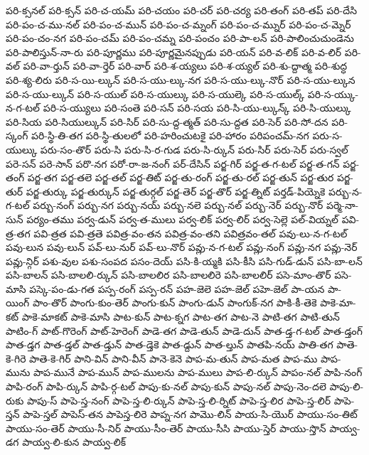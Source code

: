 {పరి-క్సనల్
పరి-క్సన్
పరి-చ-యమ్
పరి-చయం
పరి-చర్
పరి-చర్య
పరి-తంగ్
పరి-తప్
పరి-దేసి
పరి-పం-చ-ము-నల్
పరి-పం-చ-మున్
పరి-పం-చ-మ్నంగ్
పరి-పం-చ-మ్నుర్
పరి-పం-చ-మ్నెర్
పరి-పం-చం-నగ
పరి-పం-చమ్
పరి-పం-చమ్న
పరి-పంచం
పరి-పా-లన్
పరి-పాలించుచుండెను
పరి-పాలిస్తున్-నా-రు
పరి-పూర్ణము
పరి-పూర్ణమైనప్పుడు
పరి-యన్
పరి-వ-లిక్
పరి-వ-లిర్
పరి-వల్
పరి-వా-ర్తున్
పరి-వా-ర్తెర్
పరి-వార్
పరి-శ-య్యలు
పరి-శ-య్యల్
పరి-శు-ద్దాత్మ
పరి-శుద్ధ
పరి-శ్య-లిరు
పరి-స-యి-ల్కున్
పరి-స-యు-ల్కు-నగ
పరి-స-యు-ల్కు-నొర్
పరి-స-యు-ల్కున
పరి-స-యు-ల్కున్
పరి-స-యుల్
పరి-స-యుల్కు
పరి-స-యుల్కె
పరి-స-యుల్క్
పరి-స-య్కు-న-గ-టల్
పరి-స-య్యులు
పరి-సంతె
పరి-సన్
పరి-సయ
పరి-సి-యు-ల్కున్క్
పరి-సి-యుల్కు
పరి-సియ
పరి-సియుల్కున్
పరి-సిర్
పరి-సు-ద్ద-త్మత్
పరి-సు-ద్దత
పరి-సెర్
పరి-సో-దన
పరి-స్కంగ్
పరి-స్థి-తి-తగ
పరి-స్థి-తులలో
పరి-హరించుటకై
పరి-హారం
పరిపంచమ్-నగ
పరు-స-యుల్కు
పరు-సం-తొర్
పరు-సి
పరు-సి-ర-గుడ
పరు-సి-ర్కున్
పరు-సిర్
పరు-సెర్
పరు-స్వల్
పరె-సన్
పరె-సాన్
పరొ-నగ
పరో-రా-జ-నంగ్
పర్-దేసిన్
పర్జ-గిర్
పర్జ-త-గ-టల్
పర్జ-త-గన్
పర్జ-తంగ్
పర్జ-తగ
పర్జ-తలె
పర్జ-తల్
పర్జ-తిట్
పర్జ-తు-రంగ్
పర్జ-తు-రల్
పర్జ-తున్
పర్జ-తుర
పర్జ-తుర్
పర్జ-తుర్కు
పర్జ-తుర్కున్
పర్జ-తుర్గల్
పర్జ-తెర్
పర్జ-తొర్
పర్జ-త్నిట్
పర్తడ్-పియ్నెకె
పర్బు-న-గ-టల్
పర్బు-నంగ్
పర్బు-నగ
పర్బు-నయ్
పర్బు-నలె
పర్బు-నల్
పర్బు-నెర్
పర్బు-నొర్
పర్మె-నా-సున్
పర్యం-తము
పర్వ-డున్
పర్వ-త-ములు
పర్వ-లిక్
పర్వ-లిర్
పర్వ-సెల్లె
పల్-వియ్నల్
పవి-త్ర-తగ
పవి-త్రత
పవి-త్రతె
పవిత్ర-వం-తన
పవిత్ర-వం-తని
పవిత్రవం-తల్
పవు-లు-న-గ-టల్
పవు-లున
పవు-లున్
పవ్-లు-నుర్
పవ్-లు-నొర్
పవ్లు-న-గ-టల్
పవ్లు-నంగ్
పవ్లు-నగ
పవ్లు-నెర్
పవ్లు-న్గిర్
పశు-వుల
పశు-సంపద
పసం-దెయ్
పసి-కి-య్మకి
పసి-కీసి
పసి-గుడ్-డున్
పసి-బా-లన్
పసి-బాలన్
పసి-బాలలి-ర్కున్
పసి-బాలలిర
పసి-బాలలిరె
పసి-బాలలిర్
పసె-మాం-తొర్
పసె-మాసి
పస్కె-పం-డు-గత
పస్ప-రంగ్
పస్ప-రన్
పహ-జెలె
పహ-జెల్
పహె-జెల్
పా-యన
పా-యింగ్
పాం-తొర్
పాంగు-కుం-తెర్
పాంగు-కున్
పాంగు-డున్
పాంగుక్-నగ
పాకి-కీ-తెకె
పాకె-మా-కట్
పాకె-మాకట్
పాకె-మాసి
పాట-కున్
పాట-క్నగ
పాట-తగ
పాట-నె
పాటి-తగ
పాటి-తున్
పాటిం-గ్
పాట్-గొరెంగ్
పాట్-హెరెంగ్
పాడె-తగ
పాడె-తున్
పాడె-దున్
పాత-డ్త-గ-టల్
పాత-డ్తంగ్
పాత-డ్తగ
పాత-డ్తల్
పాత-డ్తున్
పాత-డ్తెకె
పాత-డ్దున్
పాత-ల్తున్
పాతపి-నయ్
పాతి-తగ
పాతె-కె-గిరె
పాతె-కె-గిర్
పాని-విన్
పాని-వీన్
పానె-కెనె
పాప-మ-తున్
పాప-మత
పాప-ము
పాప-మును
పాప-మునే
పాప-మున్
పాప-ములను
పాప-ములు
పాప-లి-ర్కున్
పాపం-నల్
పాపి-నంగ్
పాపి-రంగ్
పాపి-ర్కున్
పాపి-ర్గ-టల్
పాపు-కు-నల్
పాపు-కున్
పాపు-నల్
పాపు-నెం-దలె
పాపు-లి-రుకు
పాపు-స్
పాపె-స్త-నంగ్
పాపె-స్త-లి-ర్కున్
పాపె-స్త-లి-ర్నిట్
పాపె-స్త-లిర
పాపె-స్త-లిర్
పాపె-స్తన్
పాపె-స్తల్
పాపెస్-తన
పాపెస్త-లిరె
పాప్న-నగ
పామొ-లిన్
పాయ-సి-యొర్
పాయు-సం-తిట్
పాయు-సం-తెర్
పాయు-సీ-నిర్
పాయు-సీం-తెర్
పాయు-సీసి
పాయు-స్తెర్
పాయు-స్తొన్
పాయ్వ-డగ
పాయ్వ-లి-కున
పాయ్వ-లిక్
}
